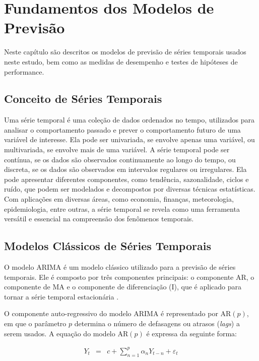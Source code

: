 \section{Fundamentos dos Modelos de Previs\~ao}\label{sec:base}

 Neste capítulo são descritos os modelos de previsão de séries temporais usados neste estudo, bem como as medidas de desempenho e testes de hipóteses de performance. 
 
 \subsection{Conceito de S\'eries Temporais}
 
Uma série temporal é uma coleção de dados ordenados no tempo, utilizados para analisar o comportamento passado e prever o comportamento futuro de uma variável de interesse. Ela pode ser univariada, se envolve apenas uma variável, ou multivariada, se envolve mais de uma variável. A série temporal pode ser contínua, se os dados são observados continuamente ao longo do tempo, ou discreta, se os dados são observados em intervalos regulares ou irregulares. Ela pode apresentar diferentes componentes, como tendência, sazonalidade, ciclos e ruído, que podem ser modelados e decompostos por diversas técnicas estatísticas. Com aplicações em diversas áreas, como economia, finanças, meteorologia, epidemiologia, entre outras, a série temporal se revela como uma ferramenta versátil e essencial na compreensão dos fenômenos temporais.

 
 \subsection{Modelos Cl\'assicos de S\'eries Temporais}\label{subsec:arima}

O modelo ARIMA é um modelo clássico utilizado para a previsão de séries temporais. Ele é composto por três componentes principais: o componente AR, o componente de MA e o componente de diferenciação (I), que é aplicado para tornar a série temporal estacionária \cite{prabhakaran2018arima}. 

O componente auto-regressivo do modelo ARIMA é representado por AR$(p)$, em que o parâmetro $p$ determina o número de defasagens ou atrasos (\textit{lags}) a serem usados. A equação do modelo AR$(p)$ é expressa da seguinte forma:
 
 \begin{eqnarray}
 	Y_t&=&c+\sum_{n=1}^{p} \alpha_n Y_{t-n} + \varepsilon_t\label{AR}
 \end{eqnarray}
 
